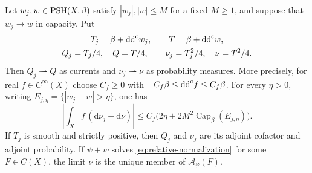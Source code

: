 \begin{corollary}\label{cor:divisorial-residual-recovery}
Let $w_j,w\in\mathrm{PSH}(X,\beta)$ satisfy $|w_j|,|w|\leq M$ for a fixed $M\geq1$, and suppose that $w_j\to w$ in capacity. Put
\[
 \begin{gathered}
 T_j=\beta+\mathrm{dd}^{\mathrm{c}} w_j,\qquad T=\beta+\mathrm{dd}^{\mathrm{c}} w,\\
 Q_j=T_j/4,\quad Q=T/4,\qquad
 \nu_j=T_j^2/4,\quad\nu=T^2/4.
 \end{gathered}
\]
Then $Q_j\rightharpoonup Q$ as currents and $\nu_j\rightharpoonup\nu$ as probability measures. More precisely, for real $f\in C^\infty(X)$ choose $C_f\geq0$ with $-C_f\beta\leq\mathrm{dd}^{\mathrm{c}} f\leq C_f\beta$. For every $\eta>0$, writing $E_{j,\eta}=\{|w_j-w|>\eta\}$, one has
\begin{equation}\label{eq:divisorial-residual-recovery}
 \left|\int_X f\,(\mathrm d\nu_j-\mathrm d\nu)\right|
 \leq C_f\bigl(2\eta+2M^2\operatorname{Cap}_\beta(E_{j,\eta})\bigr).
\end{equation}
If $T_j$ is smooth and strictly positive, then $Q_j$ and $\nu_j$ are its adjoint cofactor and adjoint probability. If $\psi+w$ solves \eqref{eq:relative-normalization} for some $F\in C(X)$, the limit $\nu$ is the unique member of $\mathcal A_\varphi(F)$.
\end{corollary}
